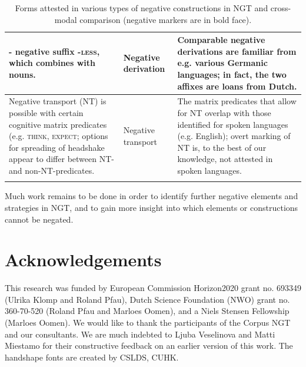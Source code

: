 \documentclass[output=paper,colorlinks,citecolor=brown]{langscibook}
\begin{document}
\begin{table}
\begin{tabularx}{\textwidth}{p{9cm}>{\raggedright}p{1.5cm}X}
                 - negative suffix \textbf{\textsc{-less}}, which combines with nouns.
        & Negative derivation 
        & Comparable negative derivations are familiar from e.g. various Germanic languages; in fact, the two affixes are loans from Dutch. \\ 
\midrule
        Negative transport (NT) is possible with certain cognitive matrix predicates (e.g. \textsc{think, expect}; options for spreading of headshake appear to differ between NT- and non-NT-predicates. 
        & Negative transport 
        & The matrix predicates that allow for NT overlap with those identified for spoken languages (e.g. English); overt marking of NT is, to the best of our knowledge, not attested in spoken languages. \\ 
        \lspbottomrule
    \end{tabularx}
    \caption{Forms attested in various types of negative constructions in NGT and cross-modal comparison (negative markers are in bold face).}
    \label{tab:conclusion}
\end{table}

\clearpage

Much work remains to be done in order to identify further negative elements and strategies in NGT, and to gain more insight into which elements or constructions cannot be negated.


\section*{Acknowledgements}
This research was funded by European Commission Horizon2020 grant no. 693349 (Ulrika Klomp and Roland Pfau), Dutch Science Foundation (NWO) grant no. 360-70-520 (Roland Pfau and Marloes Oomen), and a Niels Stensen Fellowship (Marloes Oomen). We would like to thank the participants of the Corpus NGT and our consultants. We are much indebted to Ljuba Veselinova and Matti Miestamo for their constructive feedback on an earlier version of this work.
The handshape fonts are created by CSLDS, CUHK.
\end{document}
